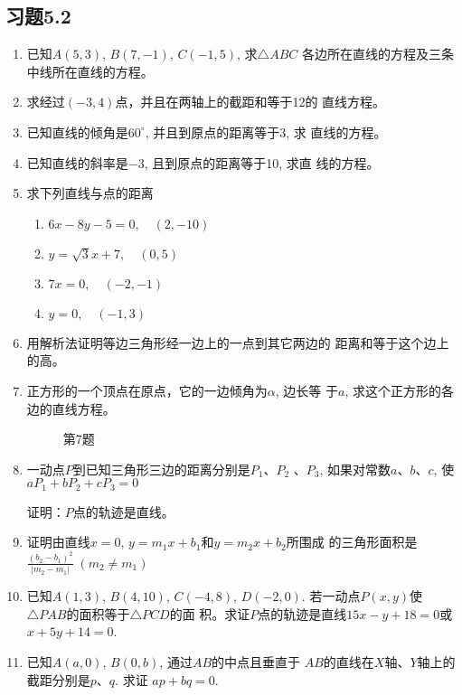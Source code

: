 \subsection*{习题5.2}
\begin{enumerate}
    \item 已知$A(5,3)$, $B(7,-1)$, $C(-1,5)$, 求$\triangle ABC$
    各边所在直线的方程及三条中线所在直线的方程。
    \item 求经过$(-3,4)$点，并且在两轴上的截距和等于12的
    直线方程。
    \item 已知直线的倾角是$60^{\circ}$, 并且到原点的距离等于3, 求
    直线的方程。
    \item 已知直线的斜率是$-3$, 且到原点的距离等于10, 求直
    线的方程。
    \item 求下列直线与点的距离
\begin{multicols}{2}
\begin{enumerate}
    \item $6x-8y-5=0,\quad (2,-10)$
    \item $y=\sqrt{3}x+7,\quad (0,5)$
    \item $7x=0,\quad (-2,-1)$
    \item $y=0,\quad (-1,3)$
\end{enumerate}
\end{multicols}

\item 用解析法证明等边三角形经一边上的一点到其它两边的
距离和等于这个边上的高。
\item 正方形的一个顶点在原点，它的一边倾角为$\alpha$, 边长等
于$a$, 求这个正方形的各边的直线方程。
\begin{figure}[htp]
    \centering
{}
    \caption*{第7题}
\end{figure}

\item 一动点$P$到已知三角形三边的距离分别是$P_1$、$P_2$
、$P_3$, 
如果对常数$a$、$b$、$c$, 使
$aP_1+bP_2+cP_3=0$

证明：$P$点的轨迹是直线。
\item 证明由直线$x=0$, $y=m_1x+b_1$和$y=m_2x+b_2$所围成
的三角形面积是
$\frac{(b_2-b_1)^2}{|m_2-m_1|}\; (m_2\ne m_1)$
\item 已知$A(1,3)$, $B(4,10)$, $C(-4,8)$, $D(-2,0)$. 
若一动点$P(x,y)$使$\triangle PAB$的面积等于$\triangle PCD$的面
积。求证$P$点的轨迹是直线$15x-y+18=0$或$x+5y+
14=0$.
\item 已知$A(a,0)$, $B(0,b)$, 通过$AB$的中点且垂直于
$AB$的直线在$X$轴、$Y$轴上的截距分别是$p$、$q$. 求证
$ap+bq=0$.
\end{enumerate}

